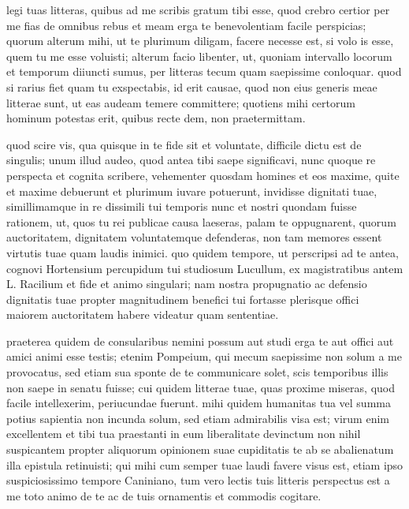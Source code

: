 


 legi tuas litteras, quibus ad me scribis gratum tibi esse, quod crebro certior per me fias de omnibus rebus et meam erga te benevolentiam facile perspicias; quorum alterum mihi, ut te plurimum diligam, facere necesse est, si volo is esse, quem tu me esse voluisti; alterum facio libenter, ut, quoniam intervallo locorum et temporum diiuncti sumus, per litteras tecum quam saepissime conloquar. quod si rarius fiet quam tu exspectabis, id erit causae, quod non eius generis meae litterae sunt, ut eas audeam temere committere; quotiens mihi certorum hominum potestas erit, quibus recte dem, non praetermittam.

 quod scire vis, qua quisque in te fide sit et voluntate, difficile dictu est de singulis; unum illud audeo, quod antea tibi saepe significavi, nunc quoque re perspecta et cognita scribere, vehementer quosdam homines et eos maxime, quite et maxime debuerunt et plurimum iuvare potuerunt, invidisse dignitati tuae, simillimamque in re dissimili tui temporis nunc et nostri quondam fuisse rationem, ut, quos tu rei publicae causa laeseras, palam te oppugnarent, quorum auctoritatem, dignitatem voluntatemque defenderas, non tam memores essent virtutis tuae quam laudis inimici. quo quidem tempore, ut perscripsi ad te antea, cognovi Hortensium percupidum tui studiosum Lucullum, ex magistratibus antem L. Racilium et fide et animo singulari; nam nostra propugnatio ac defensio dignitatis tuae propter magnitudinem benefici tui fortasse plerisque offici maiorem auctoritatem habere videatur quam sententiae.

 praeterea quidem de consularibus nemini possum aut studi erga te aut offici aut amici animi esse testis; etenim Pompeium, qui mecum saepissime non solum a me provocatus, sed etiam sua sponte de te communicare solet, scis temporibus illis non saepe in senatu fuisse; cui quidem litterae tuae, quas proxime miseras, quod facile intellexerim, periucundae fuerunt. mihi quidem humanitas tua vel summa potius sapientia non incunda solum, sed etiam admirabilis visa est; virum enim excellentem et tibi tua praestanti in eum liberalitate devinctum non nihil suspicantem propter aliquorum opinionem suae cupiditatis te ab se abalienatum illa epistula retinuisti; qui mihi cum semper tuae laudi favere visus est, etiam ipso suspiciosissimo tempore Caniniano, tum vero lectis tuis litteris perspectus est a me toto animo de te ac de tuis ornamentis et commodis cogitare.

